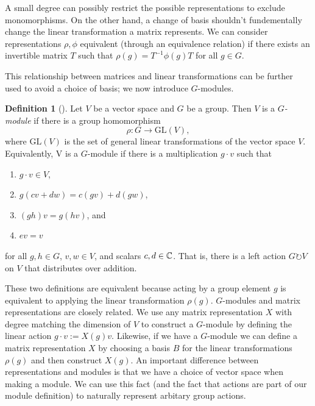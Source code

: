 \documentclass[12pt,twoside]{reedthesis}
\theoremstyle{plain}   %
\theoremstyle{definition}
\newtheorem{defn}{Definition}[section]
\theoremstyle{remark}
\numberwithin{equation}{section}
\def\GL{\mathrm{GL}} \def\SL{\mathrm{SL}}  \def\SP{\mathrm{SL}}\def\OG{\mathrm{O}}
\def\acts{\circlearrowright} %
\begin{document}
   A small degree can possibly restrict the possible representations to exclude monomorphisms.
   On the other hand, a change of basis shouldn't fundementally change the linear transformation a matrix represents.
   We can consider representations $\rho, \phi$ equivalent (through an equivalence relation) if there exists an invertible matrix $T$
   such that $\rho(g) = T^{-1} \phi(g) T$ for all $g \in G$.\par
   This relationship between matrices and linear transformations can be further used to avoid a choice of basis; we now introduce
   $G$-modules.
   \begin{defn}[{\cite[Definition 1.3.1]{sagan}}]
     Let $V$ be a vector space and $G$ be a group. Then $V$ is a \emph{$G$-module} if there is a group homomorphism
     \[\rho: G \to \GL(V),\]
     where $\GL(V)$ is the set of general linear transformations of the vector space $V$.
     Equivalently, V is a $G$-module if there is a multiplication $g \cdot v$ such that
     \begin{enumerate}
     \item $g \cdot v \in V$,
     \item $g(cv + dw) = c(gv) + d(gw)$,
     \item $(gh)v = g(hv)$, and
     \item $ev = v$
     \end{enumerate}
     for all $g,h \in G$, $v,w \in V$, and scalars $c,d \in \mathbb{C}$.
     That is, there is a left action $G \acts V$ on $V$ that distributes over addition.
   \end{defn}
   These two definitions are equivalent because acting by a group element $g$ is equivalent to applying the linear transformation $\rho(g)$.
   $G$-modules and matrix representations are closely related. We use any matrix representation $X$ with degree matching the dimension of $V$
   to construct a $G$-module by defining the linear action $g \cdot v := X(g) v$. Likewise, if we have a $G$-module we can define
   a matrix representation $X$ by choosing a basis $B$ for the linear transformations $\rho(g)$ and then construct $X(g)$.
   An important difference between representations and modules is that we have a choice of vector space when making a module.
   We can use this fact (and the fact that actions are part of our module definition) to naturally represent arbitary group actions.
\end{document}
